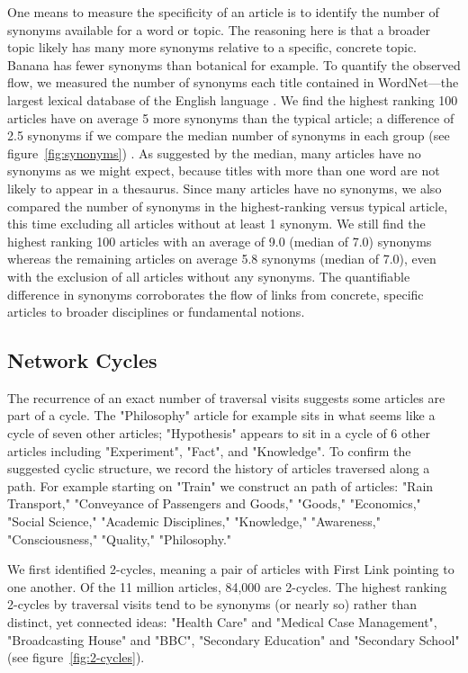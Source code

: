 \documentclass[pre,twocolumn,twoside,superscriptaddress,floatfix, aps, 10pt]{revtex4-1}
\begin{document}
One means to measure the specificity of an article is to identify the number of synonyms available for a word or topic. The reasoning here is that a  broader topic likely has many more synonyms relative to a specific, concrete topic. Banana has fewer synonyms than botanical for example. To quantify the observed flow, we measured the number of synonyms each title contained in WordNet---the largest lexical database of the English language 
\cite{wordnet}. 
We find the highest ranking 100 articles have on average 5 more synonyms than the typical article; a difference of 2.5 synonyms if we compare the median number of synonyms in each group
(see figure~\ref{fig:synonyms})
. 
As suggested by the median, many articles have no synonyms as we might expect, because titles with more than one word are not likely to appear in a thesaurus. 
Since many articles have no synonyms, we also compared the number of synonyms in the highest-ranking versus typical article, this time excluding all articles without at least 1 synonym. 
We still find the highest ranking 100 articles with an average of 9.0 (median of 7.0) synonyms whereas the remaining articles on average 5.8 synonyms (median of 7.0), even with the exclusion of all articles without any synonyms.
The quantifiable difference in synonyms corroborates the flow of links from concrete, specific articles to broader disciplines or fundamental notions.




\subsection{Network Cycles}

The recurrence of an exact number of traversal visits suggests some articles are part of a cycle. 
The "Philosophy" article for example sits in what seems like a cycle of seven other articles; "Hypothesis" appears to sit in a 
cycle of 6 other articles including "Experiment", "Fact", and "Knowledge".
To confirm the suggested cyclic structure, we record the history of articles traversed along a path. For example starting on "Train" we construct an path of articles: 
"Rain Transport,"
"Conveyance of Passengers and Goods," 
"Goods," 
"Economics,"
"Social Science,"
"Academic Disciplines,"
"Knowledge,"
"Awareness,"
"Consciousness,"
"Quality,"
"Philosophy."

We first identified 2-cycles, meaning a pair of articles with First Link pointing to one another.
Of the 11 million articles, 84,000 are 2-cycles. 
The highest ranking 2-cycles by traversal visits tend to be synonyms (or nearly so) rather than distinct, yet connected ideas:
"Health Care" and "Medical Case Management", "Broadcasting House" and "BBC", "Secondary Education" and "Secondary School" 
(see figure~\ref{fig:2-cycles}).
\end{document}
